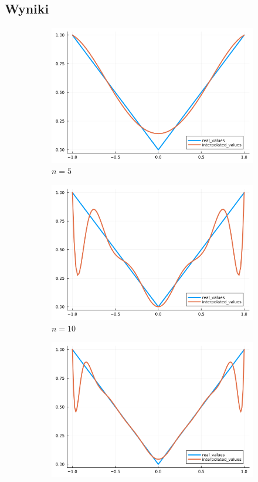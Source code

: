 \documentclass{article}
\def\v{0.47}
\begin{document}
\subsection*{Wyniki}
	\begin{figure}[H]
	    \centering
		\begin{subfigure}[b]{\v\linewidth}
			\includegraphics[width=\linewidth]{graphs/zad6.a.5.png}
			\caption{$n = 5$}
		\end{subfigure}
		\begin{subfigure}[b]{\v\linewidth}
			\includegraphics[width=\linewidth]{graphs/zad6.a.10.png}
			\caption{$n = 10$}
		\end{subfigure}
		\begin{subfigure}[b]{\v\linewidth}
			\includegraphics[width=\linewidth]{graphs/zad6.a.15.png}

\end{subfigure}
\end{figure}
\end{document}
